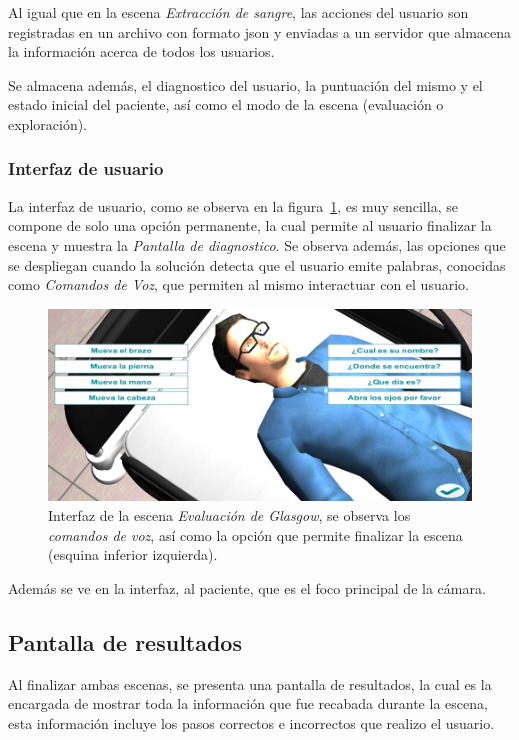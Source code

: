 Al igual que en la escena \emph{Extracción de sangre}, las acciones del usuario
son registradas en un archivo con formato \Gls{json} y enviadas a un servidor
que almacena la información acerca de todos los usuarios.

Se almacena además, el diagnostico del usuario, la puntuación del mismo y el
estado inicial del paciente, así como el modo de la escena (evaluación o
exploración).

\subsubsection{Interfaz de usuario}

La interfaz de usuario, como se observa en la figura~\ref{fig:glasgow_gui}, es
muy sencilla, se compone de solo una opción permanente, la cual permite al
usuario finalizar la escena y muestra la \emph{Pantalla de diagnostico}. Se
observa además, las opciones que se despliegan cuando la solución detecta que el
usuario emite palabras, conocidas como \emph{Comandos de Voz}, que permiten al
mismo interactuar con el usuario.

\begin{figure}[H]
\centering
\includegraphics[scale=0.5]{propuesta/glasgow_comandos_voz.jpg}
\caption{Interfaz de la escena \emph{Evaluación de Glasgow}, se observa los
    \emph{comandos de voz}, así como la opción que permite finalizar la escena
    (esquina inferior izquierda).}
\label{fig:glasgow_gui}
\end{figure}

Además se ve en la interfaz, al paciente, que es el foco principal de la cámara.

\subsection{Pantalla de resultados}

Al finalizar ambas escenas, se presenta una pantalla de resultados, la cual es
la encargada de mostrar toda la información que fue recabada durante la escena,
esta información incluye los pasos correctos e incorrectos que realizo el
usuario.

